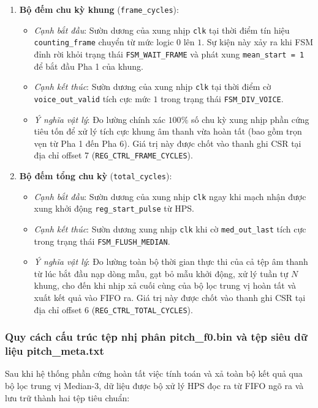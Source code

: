 \begin{enumerate}
    \item \textbf{Bộ đếm chu kỳ khung} (\texttt{frame\_cycles}):
    \begin{itemize}
        \item \emph{Cạnh bắt đầu}: Sườn dương của xung nhịp \texttt{clk} tại thời điểm tín hiệu \texttt{counting\_frame} chuyển từ mức logic $0$ lên $1$. Sự kiện này xảy ra khi FSM đỉnh rời khỏi trạng thái \texttt{FSM\_WAIT\_FRAME} và phát xung \texttt{mean\_start = 1} để bắt đầu Pha 1 của khung.
        \item \emph{Cạnh kết thúc}: Sườn dương của xung nhịp \texttt{clk} tại thời điểm cờ \texttt{voice\_out\_valid} tích cực mức $1$ trong trạng thái \texttt{FSM\_DIV\_VOICE}.
        \item \emph{Ý nghĩa vật lý}: Đo lường chính xác $100\%$ số chu kỳ xung nhịp phần cứng tiêu tốn để xử lý tích cực khung âm thanh vừa hoàn tất (bao gồm trọn vẹn từ Pha 1 đến Pha 6). Giá trị này được chốt vào thanh ghi CSR tại địa chỉ offset 7 (\texttt{REG\_CTRL\_FRAME\_CYCLES}).
    \end{itemize}

    \item \textbf{Bộ đếm tổng chu kỳ} (\texttt{total\_cycles}):
    \begin{itemize}
        \item \emph{Cạnh bắt đầu}: Sườn dương của xung nhịp \texttt{clk} ngay khi mạch nhận được xung khởi động \texttt{reg\_start\_pulse} từ HPS.
        \item \emph{Cạnh kết thúc}: Sườn dương xung nhịp \texttt{clk} khi cờ \texttt{med\_out\_last} tích cực trong trạng thái \texttt{FSM\_FLUSH\_MEDIAN}.
        \item \emph{Ý nghĩa vật lý}: Đo lường toàn bộ thời gian thực thi của cả tệp âm thanh từ lúc bắt đầu nạp dòng mẫu, gạt bỏ mẫu khởi động, xử lý tuần tự $N$ khung, cho đến khi nhịp xả cuối cùng của bộ lọc trung vị hoàn tất và xuất kết quả vào FIFO ra. Giá trị này được chốt vào thanh ghi CSR tại địa chỉ offset 6 (\texttt{REG\_CTRL\_TOTAL\_CYCLES}).
    \end{itemize}
\end{enumerate}

\subsubsection*{Quy cách cấu trúc tệp nhị phân pitch\_f0.bin và tệp siêu dữ liệu pitch\_meta.txt}
Sau khi hệ thống phần cứng hoàn tất việc tính toán và xả toàn bộ kết quả qua bộ lọc trung vị Median-3, dữ liệu được bộ xử lý HPS đọc ra từ FIFO ngõ ra và lưu trữ thành hai tệp tiêu chuẩn:

